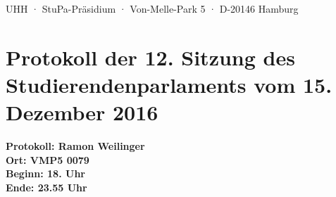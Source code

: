 \documentclass[ngerman,headheight=70pt]{scrartcl}
\begin{document}
    UHH · StuPa-Präsidium · Von-Melle-Park 5 · D-20146 Hamburg

    \section*{Protokoll der 12. Sitzung des Studierendenparlaments vom 15. Dezember 2016}

    \textbf{Protokoll: Ramon Weilinger}\\
    \textbf{Ort: VMP5 0079}\\
    \textbf{Beginn: 18. Uhr}\\
    \textbf{Ende: 23.55 Uhr}

    \vspace{0.5cm}
\end{document}
